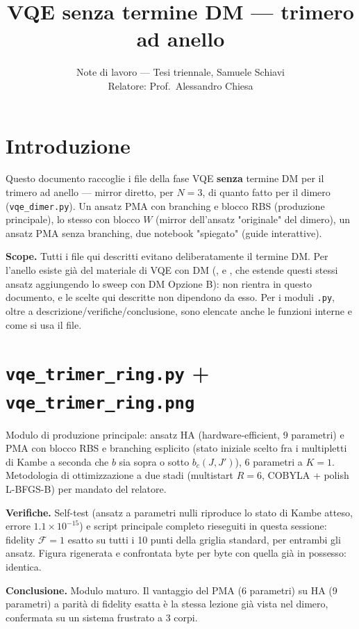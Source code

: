 \documentclass[11pt,a4paper]{article}
\title{VQE senza termine DM — trimero ad anello}
\author{Note di lavoro — Tesi triennale, Samuele Schiavi\\ Relatore: Prof.\ Alessandro Chiesa}
\date{}
\begin{document}
\maketitle

\section*{Introduzione}

Questo documento raccoglie i file della fase VQE \textbf{senza} termine DM per il
trimero ad anello — mirror diretto, per $N=3$, di quanto fatto per il dimero
(\texttt{vqe\_dimer.py}). Un ansatz PMA con branching e blocco RBS (produzione
principale), lo stesso con blocco $W$ (mirror dell'ansatz "originale" del dimero), un
ansatz PMA senza branching, due notebook "spiegato" (guide interattive).

\textbf{Scope.} Tutti i file qui descritti evitano deliberatamente il termine DM. Per
l'anello esiste già del materiale di VQE con DM
(\texttt{}, e
\texttt{}, che estende questi
stessi ansatz aggiungendo lo sweep con DM Opzione B): non rientra in questo
documento, e le scelte qui descritte non dipendono da esso. Per i moduli
\texttt{.py}, oltre a descrizione/verifiche/conclusione, sono elencate anche le
funzioni interne e come si usa il file.

\section*{\texttt{vqe\_trimer\_ring.py} + \texttt{vqe\_trimer\_ring.png}}

Modulo di produzione principale: ansatz HA (hardware-efficient, 9 parametri) e PMA con
blocco RBS e branching esplicito (stato iniziale scelto fra i multipletti di Kambe a
seconda che $b$ sia sopra o sotto $b_c(J,J')$), 6 parametri a $K=1$. Metodologia di
ottimizzazione a due stadi (multistart $R=6$, COBYLA + polish L-BFGS-B) per mandato
del relatore.

\textbf{Verifiche.} Self-test (ansatz a parametri nulli riproduce lo stato di Kambe
atteso, errore $1.1\times10^{-15}$) e script principale completo rieseguiti in questa
sessione: fidelity $\mathcal F=1$ esatto su tutti i 10 punti della griglia standard, per
entrambi gli ansatz. Figura rigenerata e confrontata byte per byte con quella già in
possesso: identica.

\textbf{Conclusione.} Modulo maturo. Il vantaggio del PMA (6 parametri) su HA (9
parametri) a parità di fidelity esatta è la stessa lezione già vista nel dimero,
confermata su un sistema frustrato a 3 corpi.
\end{document}

